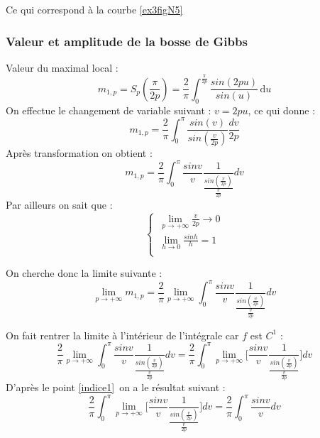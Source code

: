 \documentclass[a4paper,12pt]{report}
\begin{document}
Ce qui correspond \`a la courbe \ref{ex3figN5}

		\subsubsection{Valeur et amplitude de la bosse de Gibbs}
Valeur du maximal local :
\[m_{1,p} = S_{p}(\frac{\pi}{2p}) = \frac{2}{\pi}\displaystyle\int_{0}^{\frac{\pi}{2p}}\frac{sin(2pu)}{sin(u)} \, \mathrm{d}u\]
On effectue le changement de variable suivant : $v = 2pu$, ce qui donne :
\[m_{1,p} = \frac{2}{\pi}\displaystyle\int_{0}^{\pi}\frac{sin(v)}{sin(\frac{v}{2p})} \frac{dv}{2p}\]
Apr\`es transformation on obtient :
\[m_{1,p} = \frac{2}{\pi}\displaystyle\int_{0}^{\pi}\frac{sin v}{v}\frac{1}{\frac{sin(\frac{v}{2p})}{\frac{v}{2p}}} dv\]
Par ailleurs on sait que :\\
\begin{equation}\label{indice1}
\left\{ \,
  \begin{aligned}
  \lim\limits_{p \rightarrow +\infty} \frac{v}{2p} \rightarrow 0\\
  \lim\limits_{h \rightarrow 0} \frac{sin h}{h} = 1\\
  \end{aligned}
\right.
\end{equation}
\newpage

On cherche donc la limite suivante :\\
\[\lim\limits_{p \rightarrow +\infty} m_{1,p} = \frac{2}{\pi} \lim\limits_{p \rightarrow +\infty} \displaystyle\int_{0}^{\pi}\frac{sin v}{v}\frac{1}{\frac{sin(\frac{v}{2p})}{\frac{v}{2p}}}dv\]

On fait rentrer la limite \`a l'int\'erieur de l'int\'egrale car $f$ est $C^{1}$ :\\
\[\frac{2}{\pi} \lim\limits_{p \rightarrow +\infty} \displaystyle\int_{0}^{\pi}\frac{sin v}{v}\frac{1}{\frac{sin(\frac{v}{2p})}{\frac{v}{2p}}}dv = \frac{2}{\pi} \displaystyle\int_{0}^{\pi} \lim\limits_{p \rightarrow +\infty} \bigg[\frac{sin v}{v}\frac{1}{\frac{sin(\frac{v}{2p})}{\frac{v}{2p}}}\bigg]dv\]
 D'apr\`es le point \eqref{indice1}\ on a le r\'esultat suivant :
 \[\frac{2}{\pi} \displaystyle\int_{0}^{\pi} \lim\limits_{p \rightarrow +\infty} \bigg[\frac{sin v}{v}\frac{1}{\frac{sin(\frac{v}{2p})}{\frac{v}{2p}}}\bigg]dv = \frac{2}{\pi} \displaystyle\int_{0}^{\pi}\frac{sin v}{v}dv\]
\end{document}
